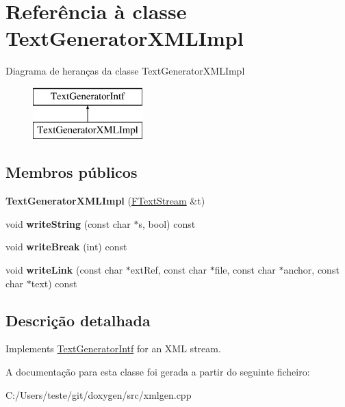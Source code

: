 \hypertarget{class_text_generator_x_m_l_impl}{\section{Referência à classe Text\-Generator\-X\-M\-L\-Impl}
\label{class_text_generator_x_m_l_impl}
}
Diagrama de heranças da classe Text\-Generator\-X\-M\-L\-Impl\begin{figure}[H]
\begin{center}
\leavevmode
\includegraphics[height=2.000000cm]{class_text_generator_x_m_l_impl}
\end{center}
\end{figure}
\subsection*{Membros públicos}
\begin{DoxyCompactItemize}
\item 
\hypertarget{class_text_generator_x_m_l_impl_ac1f2afcc54be2e9b575be67a1bc7e75b}{{\bfseries Text\-Generator\-X\-M\-L\-Impl} (\hyperlink{class_f_text_stream}{F\-Text\-Stream} \&t)}\label{class_text_generator_x_m_l_impl_ac1f2afcc54be2e9b575be67a1bc7e75b}

\item 
\hypertarget{class_text_generator_x_m_l_impl_aa314bc3ac22ec70f185411f56a1c2756}{void {\bfseries write\-String} (const char $\ast$s, bool) const }\label{class_text_generator_x_m_l_impl_aa314bc3ac22ec70f185411f56a1c2756}

\item 
\hypertarget{class_text_generator_x_m_l_impl_a7c1fa93dbcc591404627e0dc47a64db3}{void {\bfseries write\-Break} (int) const }\label{class_text_generator_x_m_l_impl_a7c1fa93dbcc591404627e0dc47a64db3}

\item 
\hypertarget{class_text_generator_x_m_l_impl_a1c59b643d4316e056c36a14895ebddaa}{void {\bfseries write\-Link} (const char $\ast$ext\-Ref, const char $\ast$file, const char $\ast$anchor, const char $\ast$text) const }\label{class_text_generator_x_m_l_impl_a1c59b643d4316e056c36a14895ebddaa}

\end{DoxyCompactItemize}


\subsection{Descrição detalhada}
Implements \hyperlink{class_text_generator_intf}{Text\-Generator\-Intf} for an X\-M\-L stream. 

A documentação para esta classe foi gerada a partir do seguinte ficheiro\-:\begin{DoxyCompactItemize}
\item 
C\-:/\-Users/teste/git/doxygen/src/xmlgen.\-cpp\end{DoxyCompactItemize}

